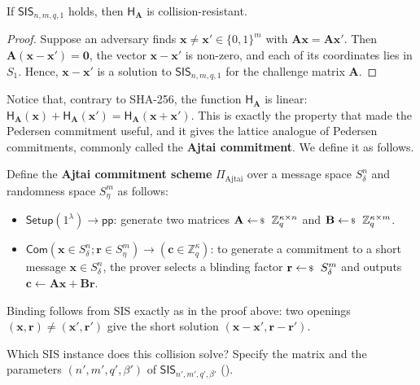 \documentclass[../../book.tex]{subfiles}
\begin{document}
\begin{proposition}
    If $\mathsf{SIS}_{n,m,q,1}$ holds, then $\mathsf{H}_{\mathbf{A}}$ is collision-resistant.
\end{proposition}

\begin{proof}
    Suppose an adversary finds $\mathbf{x} \neq \mathbf{x}' \in \{0,1\}^m$ with $\mathbf{A}\mathbf{x} = \mathbf{A}\mathbf{x}'$.
    Then $\mathbf{A}(\mathbf{x}-\mathbf{x}') = \mathbf{0}$, the vector $\mathbf{x}-\mathbf{x}'$ is non-zero, and each of its coordinates lies in $S_1$.
    Hence, $\mathbf{x}-\mathbf{x}'$ is a solution to $\mathsf{SIS}_{n,m,q,1}$ for the challenge matrix $\mathbf{A}$.
\end{proof}

Notice that, contrary to SHA-256, the function $\mathsf{H}_{\mathbf{A}}$ is linear: $\mathsf{H}_{\mathbf{A}}(\mathbf{x}) + \mathsf{H}_{\mathbf{A}}(\mathbf{x}') = \mathsf{H}_{\mathbf{A}}(\mathbf{x}+\mathbf{x}')$.
This is exactly the property that made the Pedersen commitment useful, and it gives the lattice analogue of Pedersen commitments, commonly called the \textbf{Ajtai commitment}.
We define it as follows.

\begin{definition}
    Define the \textbf{Ajtai commitment scheme} $\Pi_{\text{Ajtai}}$ over a message space $S_{\delta}^n$ and randomness space $S_{\eta}^m$ as follows:
    \begin{itemize}
        \item $\mathsf{Setup}(1^{\lambda}) \to \mathsf{pp}$: generate two matrices $\mathbf{A} \leftarrowS \mathbb{Z}_q^{\kappa \times n}$ and $\mathbf{B} \leftarrowS \mathbb{Z}_q^{\kappa \times m}$.
        \item $\mathsf{Com}(\mathbf{x} \in S_{\delta}^n; \mathbf{r} \in S_{\eta}^m) \to (\mathbf{c} \in \mathbb{Z}_q^{\kappa})$: to generate a commitment to a short message $\mathbf{x} \in S_{\delta}^n$, the prover selects a blinding factor $\mathbf{r} \leftarrowS S_{\delta}^m$ and outputs $\mathbf{c} \gets \mathbf{Ax} + \mathbf{Br}$.
    \end{itemize}
\end{definition}

Binding follows from SIS exactly as in the proof above: two openings $(\mathbf{x},\mathbf{r}) \neq (\mathbf{x}',\mathbf{r}')$ give the short solution $(\mathbf{x}-\mathbf{x}',\mathbf{r}-\mathbf{r}')$.

\begin{exercise}\label{exercise:ajtai-collision}
    Which SIS instance does this collision solve?
    Specify the matrix and the parameters $(n', m', q', \beta')$ of $\mathsf{SIS}_{n',m',q',\beta'}$ ().

\end{exercise}
\end{document}

